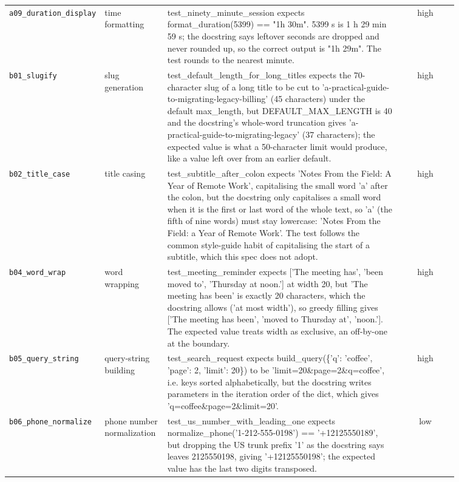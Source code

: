 \begin{small}
\begin{longtable}{p{0.20\linewidth}p{0.14\linewidth}p{0.52\linewidth}c}
\texttt{a09\_duration\_display} & time formatting & test\_ninety\_minute\_session expects format\_duration(5399) == "1h 30m". 5399 s is 1 h 29 min 59 s; the docstring says leftover seconds are dropped and never rounded up, so the correct output is "1h 29m". The test rounds to the nearest minute. & high \\
\texttt{b01\_slugify} & slug generation & test\_default\_length\_for\_long\_titles expects the 70-character slug of a long title to be cut to 'a-practical-guide-to-migrating-legacy-billing' (45 characters) under the default max\_length, but DEFAULT\_MAX\_LENGTH is 40 and the docstring's whole-word truncation gives 'a-practical-guide-to-migrating-legacy' (37 characters); the expected value is what a 50-character limit would produce, like a value left over from an earlier default. & high \\
\texttt{b02\_title\_case} & title casing & test\_subtitle\_after\_colon expects 'Notes From the Field: A Year of Remote Work', capitalising the small word 'a' after the colon, but the docstring only capitalises a small word when it is the first or last word of the whole text, so 'a' (the fifth of nine words) must stay lowercase: 'Notes From the Field: a Year of Remote Work'. The test follows the common style-guide habit of capitalising the start of a subtitle, which this spec does not adopt. & high \\
\texttt{b04\_word\_wrap} & word wrapping & test\_meeting\_reminder expects ['The meeting has', 'been moved to', 'Thursday at noon.'] at width 20, but 'The meeting has been' is exactly 20 characters, which the docstring allows ('at most width'), so greedy filling gives ['The meeting has been', 'moved to Thursday at', 'noon.']. The expected value treats width as exclusive, an off-by-one at the boundary. & high \\
\texttt{b05\_query\_string} & query-string building & test\_search\_request expects build\_query(\{'q': 'coffee', 'page': 2, 'limit': 20\}) to be 'limit=20\&page=2\&q=coffee', i.e. keys sorted alphabetically, but the docstring writes parameters in the iteration order of the dict, which gives 'q=coffee\&page=2\&limit=20'. & high \\
\texttt{b06\_phone\_normalize} & phone number normalization & test\_us\_number\_with\_leading\_one expects normalize\_phone('1-212-555-0198') == '+12125550189', but dropping the US trunk prefix '1' as the docstring says leaves 2125550198, giving '+12125550198'; the expected value has the last two digits transposed. & low \\

\end{longtable}
\end{small}
